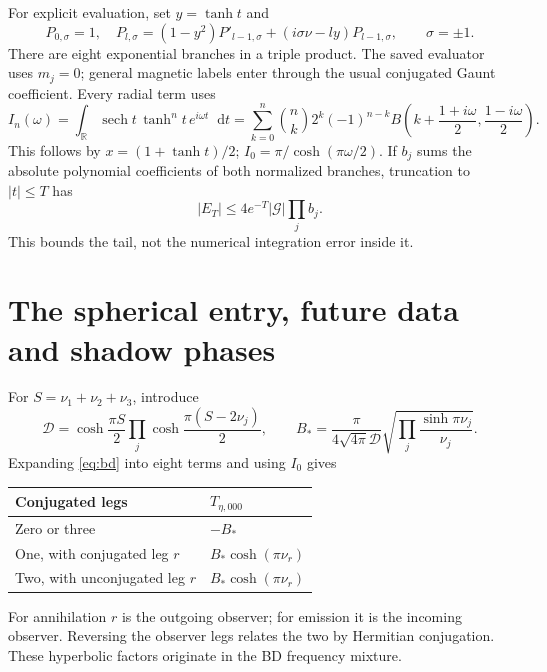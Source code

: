 \documentclass[11pt,a4paper]{article}
\newcommand{\dd}{\mathop{}\!\mathrm d}
\newcommand{\sech}{\operatorname{sech}}
\newcommand{\cD}{\mathcal D}
\begin{document}
For explicit evaluation, set $y=\tanh t$ and
\begin{equation}
 P_{0,\sigma}=1,\quad
 P_{l,\sigma}=(1-y^2)P'_{l-1,\sigma}
 +(i\sigma\nu-ly)P_{l-1,\sigma},\qquad \sigma=\pm1.
\end{equation}
There are eight exponential branches in a triple product.
The saved evaluator uses $m_j=0$; general magnetic labels enter through
the usual conjugated Gaunt coefficient. Every radial term uses
\begin{equation}
 I_n(\omega)=\int_{\mathbb R}\sech t\,\tanh^nt\,e^{i\omega t}\dd t
 =\sum_{k=0}^n{n\choose k}2^k(-1)^{n-k}
 B\left(k+\frac{1+i\omega}{2},\frac{1-i\omega}{2}\right).
 \label{eq:beta}
\end{equation}
This follows by $x=(1+\tanh t)/2$; $I_0=\pi/\cosh(\pi\omega/2)$.
If $b_j$ sums the absolute polynomial coefficients of both
normalized branches, truncation to $|t|\leq T$ has
\begin{equation}
 |E_T|\leq4e^{-T}|\mathcal G|\prod_j b_j.
 \label{eq:tail}
\end{equation}
This bounds the tail, not the numerical integration error inside it.

\newpage
\section{The spherical entry, future data and shadow phases}
For $S=\nu_1+\nu_2+\nu_3$, introduce
\begin{equation}
 \cD=\cosh\frac{\pi S}{2}\prod_j\cosh\frac{\pi(S-2\nu_j)}2,
 \qquad
 B_*=\frac{\pi}{4\sqrt{4\pi}\cD}
       \sqrt{\prod_j\frac{\sinh\pi\nu_j}{\nu_j}}.
\end{equation}
Expanding \eqref{eq:bd} into eight terms and using $I_0$ gives
\begin{center}
\begin{tabular}{ll}
\toprule
Conjugated legs & $T_{\eta,000}$\\
\midrule
Zero or three & $-B_*$\\
One, with conjugated leg $r$ & $B_*\cosh(\pi\nu_r)$\\
Two, with unconjugated leg $r$ & $B_*\cosh(\pi\nu_r)$\\
\bottomrule
\end{tabular}
\end{center}
For annihilation $r$ is the outgoing observer; for emission it is
the incoming observer. Reversing the observer legs relates the two
by Hermitian conjugation. These hyperbolic factors originate in the
BD frequency mixture.
\end{document}
